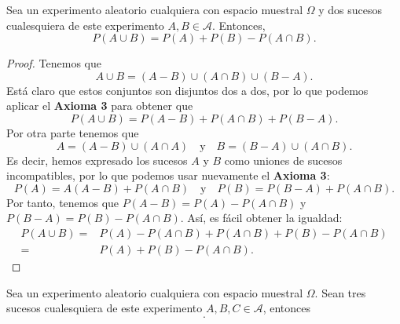 \begin{prop}
Sea un experimento aleatorio cualquiera con espacio muestral $\displaystyle \Omega  $ y dos sucesos cualesquiera de este experimento $\displaystyle A,B \in \mathcal{A} $. Entonces, 
\[P\left(A\cup B\right) = P\left(A\right) + P\left(B\right) - P\left(A \cap B\right) .\]
\end{prop}
\begin{proof}
Tenemos que 
\[A \cup B = \left(A-B\right) \cup \left(A \cap B\right) \cup \left(B-A\right) .\]
Está claro que estos conjuntos son disjuntos dos a dos, por lo que podemos aplicar el \textbf{Axioma 3} para obtener que
\[P\left(A \cup B\right) = P\left(A-B\right) + P\left(A \cap B\right) + P\left(B - A\right) .\]
Por otra parte tenemos que 
\[A = \left(A - B \right) \cup \left(A \cap A\right) \quad \text{y} \quad B = \left(B-A\right) \cup \left(A \cap B\right) .\]
Es decir, hemos expresado los sucesos $\displaystyle A $ y $\displaystyle B $ como uniones de sucesos incompatibles, por lo que podemos usar nuevamente el \textbf{Axioma 3}:
\[P\left(A\right) = A\left(A-B\right) + P\left(A \cap B\right) \quad \text{y} \quad P\left(B\right) = P\left(B - A\right) + P\left(A \cap B\right) .\]
Por tanto, tenemos que $\displaystyle P\left(A - B\right) = P\left(A\right) - P\left(A \cap B\right) $ y $\displaystyle P\left(B -A\right) = P\left(B\right)-P\left(A\cap B\right) $. Así, es fácil obtener la igualdad:
\[
\begin{split}
	P\left(A \cup B\right) = & P\left(A\right) - P\left(A \cap B\right) + P\left(A \cap B\right) + P\left(B\right) -P\left(A \cap B\right)\\
	= & P\left(A\right) + P\left(B\right) -P\left(A \cap B\right) .
\end{split}
\]
\end{proof}
\begin{prop}
Sea un experimento aleatorio cualquiera con espacio muestral $\displaystyle \Omega  $. Sean tres sucesos cualesquiera de este experimento $\displaystyle A,B, C \in \mathcal{A} $, entonces
\[ .\]

\end{prop}

